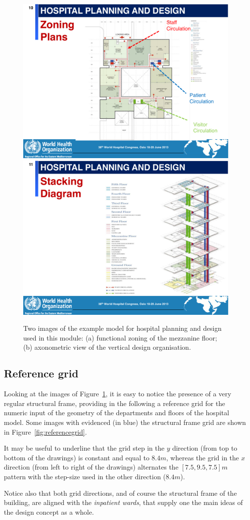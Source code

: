 \documentclass[11pt,oneside]{article}    %
\begin{document}
\begin{figure}[htbp] %
   \centering
   \includegraphics[width=0.495\linewidth]{images/hismail-1} 
   \includegraphics[width=0.495\linewidth]{images/hismail-2} 
   \caption{Two images of the example model for hospital planning and design used in this module: (a) functional zoning of the mezzanine floor; (b) axonometric view of the vertical design organisation.}
   \label{fig:hismail}
\end{figure}

\subsection{Reference grid}
\label{sec:grid}

Looking at the images of Figure~\ref{fig:hismail}, it is easy to notice the presence of a very regular structural frame, providing in the following a reference grid for the numeric input of the geometry of the departments and floors of the hospital model. Some images with evidenced (in blue) the structural frame grid are shown in Figure~\ref{fig:referencegrid}.

It may be useful to underline that the grid step in the $y$ direction (from top to bottom of the drawings) is constant and equal to $8.4 m$, whereas the grid in the $x$ direction (from left to right of the drawings) alternates the $[7.5,9.5,7.5] m$ pattern with the step-size used in the other direction ($8.4 m$). 

Notice also that both grid directions, and of course the structural frame of the building, are aligned with the \emph{inpatient wards}, that supply one the main ideas of the design concept as a whole.
\end{document}
